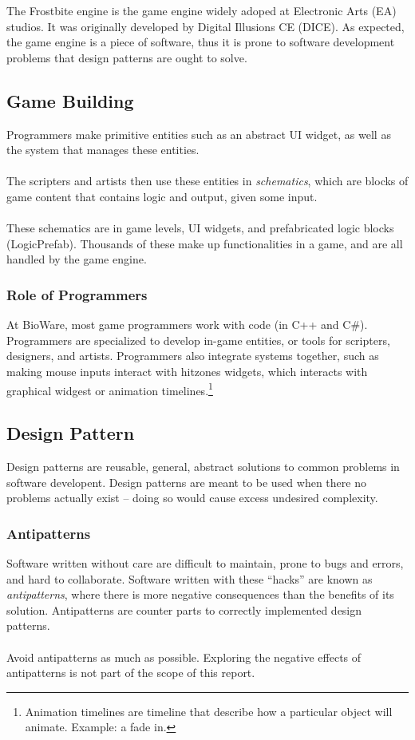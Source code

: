 \documentclass[10pt,letterpaper]{article}
\begin{document}
\begin{multicols}{2}
The Frostbite engine is the game engine widely adoped at Electronic Arts (EA) studios. It was originally developed by Digital Illusions CE (DICE).\cite{frostbite}\cite{frostbite-wiki} As expected, the game engine is a piece of software, thus it is prone to software development problems that design patterns are ought to solve.

\subsection{Game Building}

Programmers make primitive entities such as an abstract UI widget, as well as the system that manages these entities.\\
\\
The scripters and artists then use these entities in \textit{schematics}, which are blocks of game content that contains logic and output, given some input.\\
\\
These schematics are in game levels, UI widgets, and prefabricated logic blocks (LogicPrefab). Thousands of these make up functionalities in a game, and are all handled by the game engine.


\subsubsection{Role of Programmers}

At BioWare, most game programmers work with code (in C++ and C\#). Programmers are specialized to develop in-game entities, or tools for scripters, designers, and artists. Programmers also integrate systems together, such as making mouse inputs interact with hitzones widgets, which interacts with graphical widgest or animation timelines.\footnote{Animation timelines are timeline that describe how a particular object will animate. Example: a fade in.}


\subsection{Design Pattern}

Design patterns are reusable, general, abstract solutions to common problems in software developent.\cite{sm-designpatterns} Design patterns are meant to be used when there no problems actually exist -- doing so would cause excess undesired complexity.

\subsubsection{Antipatterns}
Software written without care are difficult to maintain, prone to bugs and errors, and hard to collaborate. Software written with these ``hacks'' are known as \textit{antipatterns}, where there is more negative consequences than the benefits of its solution. Antipatterns are counter parts to correctly implemented design patterns.\cite{sm-antipatterns}\\
\\
Avoid antipatterns as much as possible. Exploring the negative effects of antipatterns is not part of the scope of this report.


\end{multicols}
\end{document}
